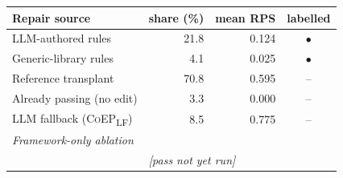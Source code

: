 \begin{tabular}{lrrc}
\toprule
Repair source & share (\%) & mean RPS & labelled \\
\midrule
LLM-authored rules & 21.8 & 0.124 & $\bullet$ \\
Generic-library rules & 4.1 & 0.025 & $\bullet$ \\
Reference transplant & 70.8 & 0.595 & -- \\
Already passing (no edit) & 3.3 & 0.000 & -- \\
\midrule
LLM fallback (\textsc{CoEP}\textsubscript{LF}) & 8.5 & 0.775 & -- \\
\midrule
\multicolumn{4}{l}{\emph{Framework-only ablation}}\\
\quad & \multicolumn{3}{l}{\emph{[pass not yet run]}} \\
\bottomrule
\end{tabular}
